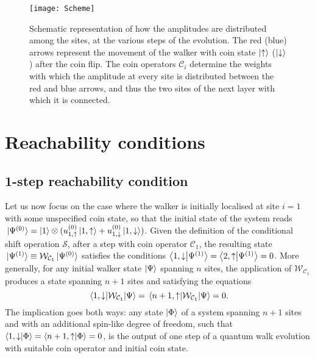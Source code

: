 \begin{figure}[ht!]
\texttt{[image: Scheme]}
	\caption{
		Schematic representation of how the amplitudes are distributed among the sites, at the various steps of the evolution.
		The red (blue) arrows represent the movement of the walker with coin state $\ket\uparrow$ ($\ket\downarrow$) after the coin flip.
		The coin operators $\mathcal C_i$ determine the weights with which the amplitude at every site is distributed between the red and blue arrows, and thus the two sites of the next layer with which it is connected.
	}
	\label{fig:walker}
\end{figure}

\section{Reachability conditions}
\label{sec:reachability}
\subsection{1-step reachability condition}
\label{sec:1step_reachability}
Let us now focus on the case where the walker is initially localised at site $i=1$ with some unspecified coin state, so that the initial state of the system reads
${\ket*{\Psi^{(0)}} = \ket{1}\otimes(u^{(0)}_{1,\uparrow} \ket{1,\uparrow} + u^{(0)}_{1,\downarrow} \ket{1,\downarrow}})$.
Given the definition of the conditional shift operation $\mathcal S$, after a step with coin operator $\mathcal C_1$, the resulting state ${\ket*{\Psi^{(1)}} \equiv \mathcal W_{\mathcal C_1} \ket*{\Psi^{(0)}}}$ satisfies the conditions 
${\braket{1, \downarrow}{\Psi^{(1)}} = \braket{2, \uparrow}{\Psi^{(1)}} = 0}$.
More generally, for any initial walker state $\ket{\Psi}$ spanning $n$ sites, the application of $\mathcal W_{\mathcal C_1}$ produces a state spanning $n+1$ sites and satisfying the equations
\begin{equation}
	\mel{1, \downarrow}{\mathcal W_{\mathcal C_1}}{\Psi} =
	\mel{n+1, \uparrow}{\mathcal W_{\mathcal C_1}}{\Psi} = 0.
	\label{eq:vanishing_endpoints}
\end{equation}
The implication goes both ways: any state $\ket\Phi$ of a system spanning $n+1$ sites and with an additional spin-like degree of freedom, such that
$
\braket{1, \downarrow}{\Phi} =
\braket{n+1, \uparrow}{\Phi} = 0
$,
is the output of one step of a quantum walk evolution with suitable coin operator and initial coin state.


